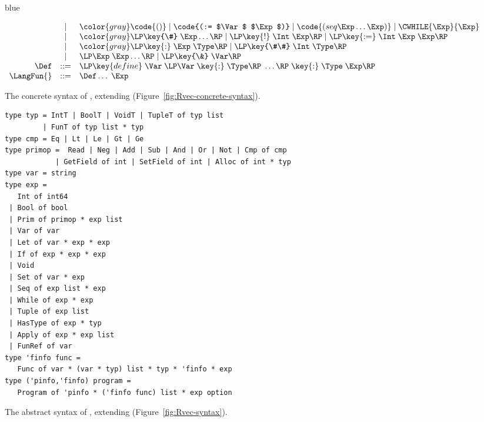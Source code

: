 \documentclass[11pt]{book}
\newcommand{\gray}[1]{{\color{gray} #1}}
\newcommand{\ocaml}[1]{{\color{blue}{#1}}}
\newenvironment{ocamlx}{
  \begin{color}{blue}
}
{
  \end{color}
}
\begin{document}
\begin{figure}[tp]
\begin{ocamlx}
{\begin{minipage}{0.96\textwidth}
\[\begin{array}{rcl}
  &\mid& \gray{\code{()} \mid \code{(:= $\Var$ $\Exp$)} 
  \mid \code{(seq \Exp\ldots \Exp)}
  \mid \CWHILE{\Exp}{\Exp}} \\
  &\mid& \gray{\LP\key{\#}\;\Exp\ldots\RP \mid \LP\key{!}\;\Int\;\Exp\RP \mid \LP\key{:=}\;\Int\;\Exp\;\Exp\RP}\\
  &\mid& \gray{\LP\key{:}\;\Exp\;\Type\RP \mid \LP\key{\#\#}\;\Int\;\Type\RP}\\
  &\mid& \LP\Exp \; \Exp \ldots\RP \mid \LP\key{\&}\;\Var\RP\\
  \Def &::=& \LP\key{define}\;\Var\;\LP\Var\;\key{:}\;\Type\RP\;\ldots\RP\;\key{:}\;{\Type}\;{\Exp}\RP \\
  \LangFun{} &::=& \Def \ldots \; \Exp
\end{array}
\]
  \end{minipage}
}  
\end{ocamlx}
\caption{The concrete syntax of \LangFun{}, extending \LangVec{} \ocaml{(\LangTuple{})} (Figure~\ref{fig:Rvec-concrete-syntax}).}
\label{fig:Rfun-concrete-syntax}
\end{figure}

\begin{figure}[tp]
\centering
\fbox{
  \begin{minipage}{0.96\textwidth}
    \small
\[
\begin{array}{lcl}
\Exp &::=& \gray{ \INT{\Int} \VAR{\Var} \mid \LET{\Var}{\Exp}{\Exp} } \\
     &\mid& \gray{ \PRIM{\itm{op}}{\Exp\ldots} }\\
     &\mid& \gray{ \BOOL{\itm{bool}} 
      \mid \IF{\Exp}{\Exp}{\Exp} } \\
     &\mid& \gray{ \VOID{} \mid \LP\key{HasType}~\Exp~\Type \RP } 
     \mid \APPLY{\Exp}{\Exp\ldots}\\
 \Def &::=& \FUNDEF{\Var}{\LP[\Var \code{:} \Type]\ldots\RP}{\Type}{\code{'()}}{\Exp}\\
  \LangFun{} &::=& \PROGRAMDEFSEXP{\code{'()}}{\LP\Def\ldots\RP)}{\Exp}
\end{array}
\]
\end{minipage}
}
\begin{lstlisting}[style=ocaml,frame=single]
type typ = IntT | BoolT | VoidT | TupleT of typ list
         | FunT of typ list * typ
type cmp = Eq | Lt | Le | Gt | Ge 
type primop =  Read | Neg | Add | Sub | And | Or | Not | Cmp of cmp
            | GetField of int | SetField of int | Alloc of int * typ
type var = string
type exp = 
   Int of int64  
 | Bool of bool
 | Prim of primop * exp list
 | Var of var
 | Let of var * exp * exp
 | If of exp * exp * exp 
 | Void
 | Set of var * exp
 | Seq of exp list * exp
 | While of exp * exp
 | Tuple of exp list
 | HasType of exp * typ
 | Apply of exp * exp list
 | FunRef of var
type 'finfo func =
   Func of var * (var * typ) list * typ * 'finfo * exp
type ('pinfo,'finfo) program =
   Program of 'pinfo * ('finfo func) list * exp option
\end{lstlisting}
\caption{The abstract syntax of \LangFun{}, extending \LangVec{} \ocaml{(\LangTuple{})} (Figure~\ref{fig:Rvec-syntax}).}
\label{fig:Rfun-syntax}
\end{figure}
\end{document}
